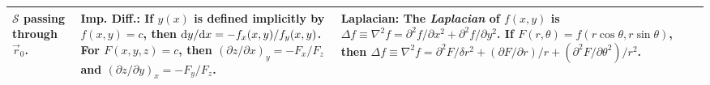 \begin{tabular}{|m{.31\linewidth}|m{.31\linewidth}|m{.31\linewidth}|}
$\mathcal{S}$ passing through $\vec{r}_0$. &
%
\textbf{Imp. Diff.}: If $y(x)$ is defined implicitly by $f(x,y)=c$, then
$\mathrm{d}y/\mathrm{d}x = -f_x(x,y)/f_y(x,y)$.  For $F(x,y,z)=c$, then
$(\partial z/\partial x)_y=-F_x/F_z$ and $(\partial z/\partial y)_x=-F_y/F_z$. &
%
\textbf{Laplacian}: The \emph{Laplacian} of $f(x,y)$ is $\Delta f \equiv
\nabla^2 f = \partial^2 f/\partial x^2 + \partial^2 f/\partial y^2$. If
$F(r,\theta)=f(r\cos\theta, r\sin\theta)$, then $\Delta f \equiv \nabla^2 f =
\partial^2 F/\delta r^2 + (\partial F/\partial r)/r + (\partial^2
F/\partial\theta^2)/r^2$. \\
%
\hline
\end{tabular}


